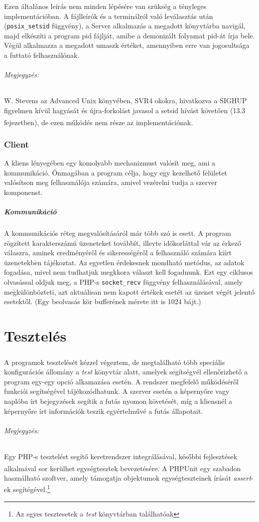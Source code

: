 \documentclass[12pt]{report}
\begin{document}
 Ezen általános leírás nem minden lépésére van szükség a tényleges implementációban. A fájlleírók és a terminálról való leválasztás után (\verb|posix_setsid| függvény), a Server alkalmazás a megadott könyvtárba navigál, majd elkészíti a program pid fájlját, amibe a demonizált folyamat pid-át írja bele. Végül alkalmazza a megadott umaszk értéket, amennyiben erre van jogosultsága a futtató felhasználónak.
 \subparagraph{Megjegyzés:}
 W. Stevens az Advanced Unix könyvében, SVR4 okokra, hivatkozva a SIGHUP figyelmen kívül hagyását és újra-forkolást javasol a setsid hívást követően (13.3 fejezetben), de ezen működés nem része az implementációnak.\textsuperscript{\cite{stevens}}
\subsection{Client}
A kliens lényegében egy komolyabb mechanizmust valósít meg, ami a kommunikáció. Önmagában a program célja, hogy egy kezelhető felületet valósítson meg felhasználója számára, amivel vezérelni tudja a szerver komponenst.
  \paragraph{Kommunikáció}
  A kommunikációs réteg megvalósításáról már több szó is esett. A program rögzített karakterszámú üzeneteket továbbít, illevte időkorláttal vár az érkező válaszra, aminek eredményéről és sikerességéről a felhasználó számára kiírt üzenetekben tájékoztat.
  Az egyetlen érdekesnek mondható metódus, az adatok fogadása, mivel nem tudhatjuk megkkora választ kell fogadnunk. Ezt egy ciklusos olvasással oldjuk meg, a PHP-s \verb|socket_recv| függvény felhasználásával, amely megkülönbözteti, azt aktuálisan nem kapott értékek esetét az üzenet végét jelentő esetektől. (Egy beolvasás kör bufferének mérete itt is 1024 bájt.)

\chapter{Tesztelés}
\paragraph{}
A programok tesztelését kézzel végeztem, de megtalálható több speciális konfigurációs állomány a \textit{test} könyvtár alatt, amelyek segítségvél ellenőrizhető a program egy-egy opció alkamazása esetén. A rendszer megfelelő működéséről funkciói segítségével tájékozódhatunk. A szerver esetén a képernyőre vagy naplóba írt bejegyzések segítik a futás nyomon követését, míg a kliensnél a képernyőre írt információk teszik egyértelművé a futás állapotait. 
\subparagraph{Megjegyzés:}
Egy PHP-s tesztelést segítő keretrendszer integrálásával, későbbi fejlesztések alkalmával sor kerülhet egységtesztek bevezetésére. A PHPUnit\textsuperscript{\cite{phpunit}} egy szabadon használható szoftver, amely támogatja objektumok egységteszteinek írását \textit{assert}-ek segítégével.\footnote{Az egyes tesztesetek a \textit{test} könyvtárban találhatóak}
\end{document}
